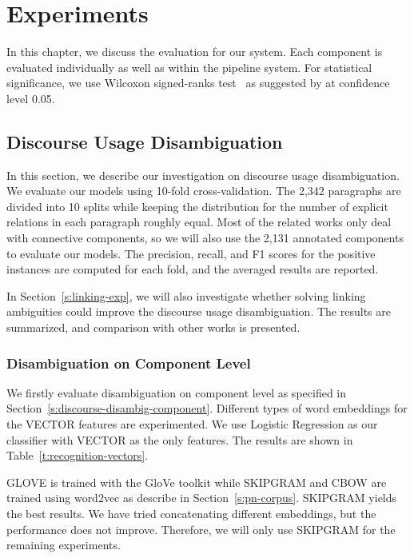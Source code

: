 %
%
%
\chapter{Experiments}
\label{c:exp}

In this chapter, we discuss the evaluation for our system. Each component
is evaluated individually as well as within the pipeline system. For
statistical significance, we use Wilcoxon signed-ranks test~\citep{wilcoxon1945individual}
as suggested by \cite{demvsar2006statistical} at confidence level 0.05.

\section{Discourse Usage Disambiguation}
\label{s:discourse-usage-exp}

In this section, we describe our investigation
on discourse usage disambiguation. We evaluate our models using
10-fold cross-validation. The 2,342 paragraphs are divided  into 10 splits
while keeping the distribution for the number of explicit relations
in each paragraph roughly equal. Most of the related works only
deal with connective components, so we will also use the 2,131 annotated
components to evaluate our models.
The precision, recall, and F1 scores for the positive instances are computed
for each fold, and the averaged results are reported.

In Section~\ref{s:linking-exp}, we will also investigate whether solving linking
ambiguities could improve the discourse usage disambiguation. The results
are summarized, and comparison with other works is presented.


\subsection{Disambiguation on Component Level}

We firstly evaluate disambiguation on component level as specified in
Section~\ref{s:discourse-disambig-component}.  
Different types of word embeddings for
the VECTOR features are experimented. We use Logistic Regression
as our classifier with VECTOR as the only features. The results are
shown in Table~\ref{t:recognition-vectors}. 



GLOVE is trained with the GloVe toolkit while SKIPGRAM and CBOW are trained
using word2vec as describe in Section~\ref{s:pn-corpus}. SKIPGRAM yields
the best results. We have tried concatenating different embeddings,
but the performance does not improve. Therefore, we will only use SKIPGRAM
for the remaining experiments.

